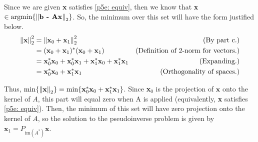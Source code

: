 \partbreak
\begin{solution}

    Since we are given \textbf{x} satisfies \ref{p5e: equiv}, then we know that \textbf{x} $\in \operatorname*{argmin}\{ \norm{\textbf{b - A\textbf{x}}}_2\}$. So, the minimum over this set will have the form justified below.
    \alignbreak
    \begin{align}
        \norm{\textbf{x}}^2_2 &= \norm{\textbf{x}_0 + \textbf{x}_1}^2_2 &\text{(By part c.)}\nonumber\\
        &= (\textbf{x}_0 + \textbf{x}_1)^*(\textbf{x}_0 + \textbf{x}_1) &\text{(Definition of $2$-norm for vectors.)}\nonumber\\
        &= \textbf{x}_0^*\textbf{x}_0 + \textbf{x}_0^*\textbf{x}_1 + \textbf{x}_1^*\textbf{x}_0 + \textbf{x}_1^*\textbf{x}_1 &\text{(Expanding.)}\nonumber\\
        &= \textbf{x}_0^*\textbf{x}_0 + \textbf{x}_1^*\textbf{x}_1 &\text{(Orthogonality of spaces.)}\nonumber
    \end{align}
    \alignbreak

    Thus, $\min \{\norm{\textbf{x}}_2 \} = \min \{ \textbf{x}_0^*\textbf{x}_0 + \textbf{x}_1^*\textbf{x}_1 \}$. Since \textbf{x}$_0$ is the projection of $\textbf{x}$ onto the kernel of $A$, this part will equal zero when A is applied (equivalently, \textbf{x} satisfies \ref{p5e: equiv}). Then, the minimum of this set will have zero projection onto the kernel of $A$, so the solution to the pseudoinverse problem is given by $\textbf{x}_1 = P_{\text{im}(A^*)}\textbf{x}$.  
\end{solution}

\newpage
